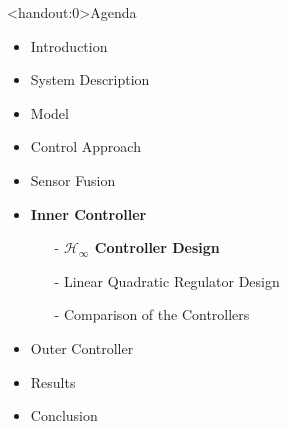 
\begin{frame}<handout:0>{Agenda}{}
    \begin{itemize}
        \item Introduction
        \item System Description
        \item Model
        \item Control Approach
        \item Sensor Fusion
        \item \textcolor{aaublue}{\textbf{Inner Controller}}
        \begin{itemize}
            \item[-] \textcolor{aaublue}{\textbf{$\mathcal{H}_\infty$ Controller Design}}
            \item[-] Linear Quadratic Regulator Design
            \item[-] Comparison of the Controllers
        \end{itemize}
        \item Outer Controller
        \item Results
        \item Conclusion
    \end{itemize}
\end{frame}